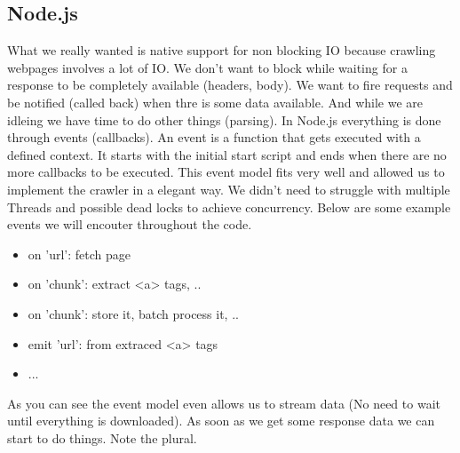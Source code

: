 \subsection{Node.js}
What we really wanted is native support for non blocking IO because crawling webpages involves a lot of IO. We don't want to block while waiting for a response to be completely available (headers, body). We want to fire requests and be notified (called back) when thre is some data available. And while we are idleing we have time to do other things (parsing). In Node.js everything is done through events (callbacks). An event is a function that gets executed with a defined context. It starts with the initial start script and ends when there are no more callbacks to be executed. This event model fits very well and allowed us to implement the crawler in a elegant way. We didn't need to struggle with multiple Threads and possible dead locks to achieve concurrency. Below are some example events we will encouter throughout the code.

\begin{itemize}
  \item on 'url': fetch page
  \item on 'chunk': extract <a> tags, ..
  \item on 'chunk': store it, batch process it, ..
  \item emit 'url': from extraced <a> tags
  \item ...
\end{itemize}

As you can see the event model even allows us to stream data (No need to wait until everything is downloaded). As soon as we get some response data we can start to do things. Note the plural.

